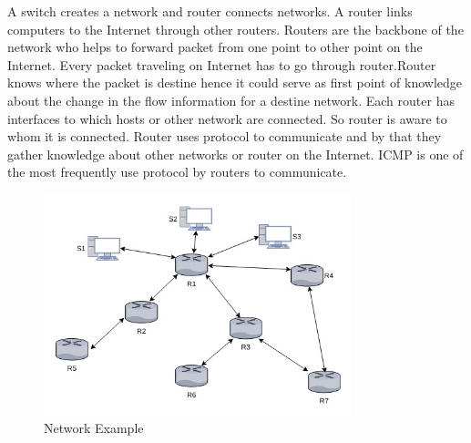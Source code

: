 \documentclass[10pt,oneside,a4paper]{article}
\begin{document}
A switch creates a network and router connects networks. A router links computers to the Internet through other routers. Routers are the backbone of the network who helps to forward packet from one point to other point on the Internet. Every packet traveling on Internet has to go through router\cite{swithcrouter}.Router knows where the packet is destine hence it could serve as first point of knowledge about the change in the flow information for a destine network. Each router has interfaces to which hosts or other network are connected. So router is aware to whom it is connected. Router uses protocol to communicate and by that they gather knowledge about other networks or router on the Internet. ICMP\cite{icmp} is one of the most frequently use protocol by routers to communicate.\par

\begin{figure}[H]
\centering
\includegraphics[width=0.80\textwidth]{routers.jpg}
\caption{Network Example} \label{fig:routers}
\end{figure}
\end{document}
